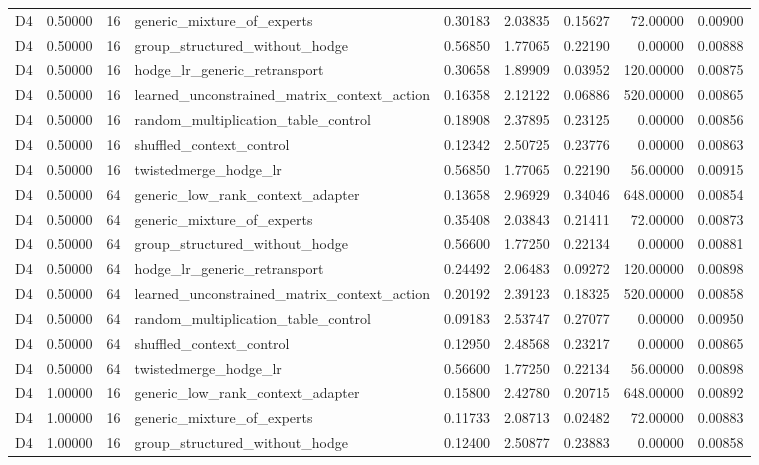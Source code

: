 \begin{tabular}{lrrlrrrrr}
D4 & 0.50000 & 16 & generic_mixture_of_experts & 0.30183 & 2.03835 & 0.15627 & 72.00000 & 0.00900 \\
D4 & 0.50000 & 16 & group_structured_without_hodge & 0.56850 & 1.77065 & 0.22190 & 0.00000 & 0.00888 \\
D4 & 0.50000 & 16 & hodge_lr_generic_retransport & 0.30658 & 1.89909 & 0.03952 & 120.00000 & 0.00875 \\
D4 & 0.50000 & 16 & learned_unconstrained_matrix_context_action & 0.16358 & 2.12122 & 0.06886 & 520.00000 & 0.00865 \\
D4 & 0.50000 & 16 & random_multiplication_table_control & 0.18908 & 2.37895 & 0.23125 & 0.00000 & 0.00856 \\
D4 & 0.50000 & 16 & shuffled_context_control & 0.12342 & 2.50725 & 0.23776 & 0.00000 & 0.00863 \\
D4 & 0.50000 & 16 & twistedmerge_hodge_lr & 0.56850 & 1.77065 & 0.22190 & 56.00000 & 0.00915 \\
D4 & 0.50000 & 64 & generic_low_rank_context_adapter & 0.13658 & 2.96929 & 0.34046 & 648.00000 & 0.00854 \\
D4 & 0.50000 & 64 & generic_mixture_of_experts & 0.35408 & 2.03843 & 0.21411 & 72.00000 & 0.00873 \\
D4 & 0.50000 & 64 & group_structured_without_hodge & 0.56600 & 1.77250 & 0.22134 & 0.00000 & 0.00881 \\
D4 & 0.50000 & 64 & hodge_lr_generic_retransport & 0.24492 & 2.06483 & 0.09272 & 120.00000 & 0.00898 \\
D4 & 0.50000 & 64 & learned_unconstrained_matrix_context_action & 0.20192 & 2.39123 & 0.18325 & 520.00000 & 0.00858 \\
D4 & 0.50000 & 64 & random_multiplication_table_control & 0.09183 & 2.53747 & 0.27077 & 0.00000 & 0.00950 \\
D4 & 0.50000 & 64 & shuffled_context_control & 0.12950 & 2.48568 & 0.23217 & 0.00000 & 0.00865 \\
D4 & 0.50000 & 64 & twistedmerge_hodge_lr & 0.56600 & 1.77250 & 0.22134 & 56.00000 & 0.00898 \\
D4 & 1.00000 & 16 & generic_low_rank_context_adapter & 0.15800 & 2.42780 & 0.20715 & 648.00000 & 0.00892 \\
D4 & 1.00000 & 16 & generic_mixture_of_experts & 0.11733 & 2.08713 & 0.02482 & 72.00000 & 0.00883 \\
D4 & 1.00000 & 16 & group_structured_without_hodge & 0.12400 & 2.50877 & 0.23883 & 0.00000 & 0.00858 \\

\end{tabular}
